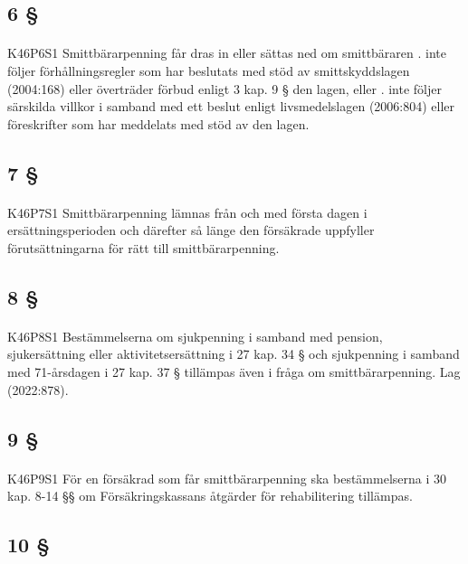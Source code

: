 \documentclass[a4paper,notitlepage,openany,10pt]{book}
\begin{document}
\subsection*{6 §}
\paragraph*{}
{\tiny K46P6S1}
Smittbärarpenning får dras in eller sättas ned om smittbäraren
. inte följer förhållningsregler som har beslutats med stöd av smittskyddslagen (2004:168) eller överträder förbud enligt 3 kap. 9 § den lagen, eller
. inte följer särskilda villkor i samband med ett beslut enligt livsmedelslagen (2006:804) eller föreskrifter som har meddelats med stöd av den lagen.
\subsection*{7 §}
\paragraph*{}
{\tiny K46P7S1}
Smittbärarpenning lämnas från och med första dagen i ersättningsperioden och därefter så länge den försäkrade uppfyller förutsättningarna för rätt till smittbärarpenning.
\subsection*{8 §}
\paragraph*{}
{\tiny K46P8S1}
Bestämmelserna om sjukpenning i samband med pension, sjukersättning eller aktivitetsersättning i 27 kap. 34 § och sjukpenning i samband med 71-årsdagen i 27 kap. 37 § tillämpas även i fråga om smittbärarpenning.
Lag (2022:878).
\subsection*{9 §}
\paragraph*{}
{\tiny K46P9S1}
För en försäkrad som får smittbärarpenning ska bestämmelserna i 30 kap. 8-14 §§ om Försäkringskassans åtgärder för rehabilitering tillämpas.
\subsection*{10 §}
\end{document}

